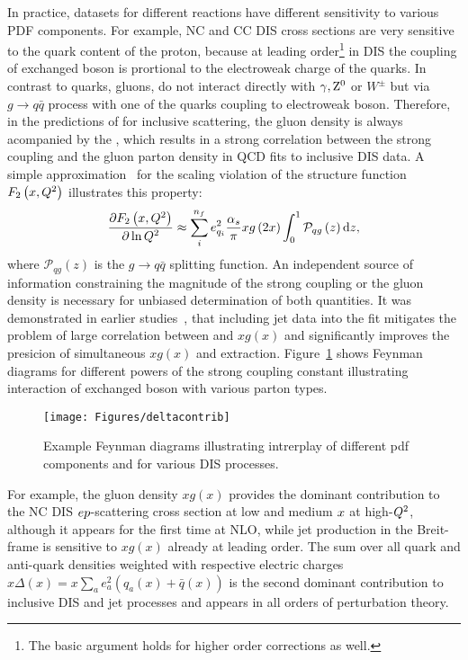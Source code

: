 In practice, datasets for different reactions have different sensitivity to various PDF components. For example, NC and CC DIS cross sections are very sensitive to the quark content of the proton, because at leading order\footnote{The basic argument holds for higher order corrections as well.} in DIS the coupling of exchanged boson is prortional to the electroweak charge of the quarks. In contrast to quarks, gluons, do not interact directly with $\gamma,\mbox{$\rm{Z}^0$}$ or $W^{\pm}$ but via $g\rightarrow q\bar q$ process with one of the quarks coupling to electroweak boson. Therefore, in the predictions of for inclusive \ep scattering, the gluon density is always acompanied by the \as, which results in a strong correlation between the strong coupling and the gluon parton density in QCD fits to inclusive DIS data. A simple approximation~\cite{Prytz:1993vr} for the scaling violation of the structure function $F_2\left(x,\mbox{${Q^2}$} \right)$ illustrates this property:
\begin{equation}
 \frac{\partial F_2\left(x,\mbox{${Q^2}$} \right)}{\partial \ln \mbox{${Q^2}$}} \approx \sum_i^{n_f}e_{q_i}^2 \frac{\mbox{$\alpha_{s}$}}{\pi} xg\left(2x\right) \int_0^1 \mathcal{P}_{qg}\left(z\right)\mathrm{d}z, 
\end{equation}
where $\mathcal{P}_{qg}\left(z\right)$ is the $g\rightarrow q\bar q$ splitting function. An independent source of information constraining the magnitude of the strong coupling or the gluon density is necessary for unbiased determination of both quantities. It was demonstrated in earlier studies~\cite{Chekanov:2005nn,H1prelim-11-143,ZEUS-prel-11-010}, that including jet data into the fit mitigates the problem of large correlation between \as and $xg\left(x\right)$ and significantly improves the presicion of simultaneous $xg\left(x\right)$ and \as extraction. Figure~\ref{fig:pdfcontributions} shows Feynman diagrams for different powers of the strong coupling constant illustrating interaction of exchanged boson with various parton types.
\begin{figure}[tp]
 \centering
 \begin{center}
 \texttt{[image: Figures/deltacontrib]}
\end{center}
 \caption{Example Feynman diagrams illustrating intrerplay of different pdf components and \as for various DIS processes.}
 \label{fig:pdfcontributions}
\end{figure}
For example, the gluon density $xg\left(x\right)$ provides the dominant contribution to the NC DIS $\mbox{$e p$}$-scattering cross section at low and medium $\mbox{${x}$}$ at high-$\mbox{${Q^2}$}$, although it appears for the first time at NLO, while jet production in the Breit-frame is sensitive to $xg\left(x\right)$ already at leading order. The sum over all quark and anti-quark densities weighted with respective electric charges $x\Delta\left(x\right)=x\sum_{a}{e_a^2\left(q_a\left(x\right)+\bar{q}\left(x\right)\right)}$ is the second dominant contribution to inclusive DIS and jet processes and appears in all orders of perturbation theory.

